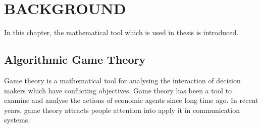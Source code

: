 \chapter{BACKGROUND}

In this chapter, the mathematical tool which is used in thesis is introduced.



\section{Algorithmic Game Theory}

Game theory is a mathematical tool for analysing the interaction of decision makers which have conflicting objectives.
Game theory has been a tool to examine and analyse the actions of economic agents since long time ago.
In recent years, game theory attracts people attention into apply it in communication systems.


